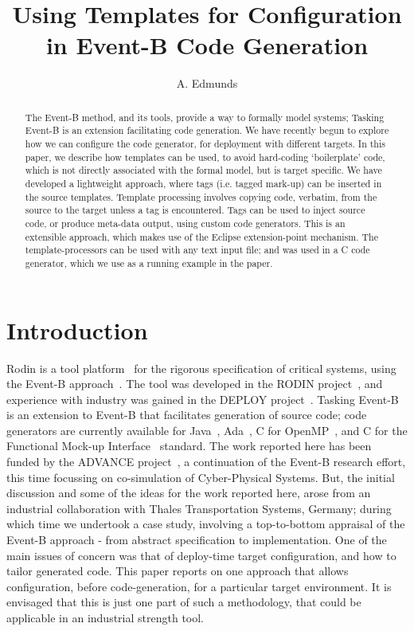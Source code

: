 \documentclass{llncs}%
\begin{document}
%
\title{Using Templates for Configuration\\ in Event-B Code Generation}

\author{A. Edmunds}


\maketitle
%
\begin{abstract}
The Event-B method, and  its tools, provide a way to formally model systems; Tasking Event-B is an extension facilitating code generation.  We have recently begun to explore how we can configure the code generator, for deployment with different targets. In this paper, we describe how templates can be used, to avoid hard-coding `boilerplate' code, which is not directly associated with the formal model, but is target specific. We have developed a lightweight approach, where tags (i.e. tagged mark-up) can be inserted in the source templates. Template processing involves copying code, verbatim, from the source to the target unless a tag is encountered. Tags can be used to inject source code, or produce meta-data output, using custom code generators. This is an extensible approach, which makes use of the Eclipse extension-point mechanism. The template-processors can be used with any text input file; and was used in a C code generator, which we use as a running example in the paper. 
 \end{abstract}
%
%
\section{Introduction}
%
Rodin is a  tool platform~\cite{abrial10rodin} for the rigorous specification of critical systems, using the Event-B approach~\cite{ABR10}. The tool was developed in the RODIN project~\cite{RodinTool}, and experience with industry was gained in the DEPLOY project~\cite{DEPLOY}. Tasking Event-B~\cite{Edmunds2009,Edmunds2008,ae2011a,ae2012b} is an extension to Event-B that facilitates generation of source code; code generators are currently available for Java~\cite{JavaSpec}, Ada~\cite{ada2005}, C for OpenMP~\cite{openmp}, and C for the Functional Mock-up Interface~\cite{FMISTD} standard. The work reported here has been funded by the ADVANCE project~\cite{advance}, a continuation of the Event-B research effort, this time focussing on co-simulation of Cyber-Physical Systems. But, the initial discussion and some of the ideas for the work reported here, arose from an industrial collaboration with Thales Transportation Systems, Germany; during which time we undertook a case study, involving a top-to-bottom appraisal of the Event-B approach - from abstract specification to implementation. One of the main issues of concern was that of deploy-time target configuration, and how to tailor generated code. This paper reports on one approach that allows configuration, before code-generation, for a particular target environment. It is envisaged that this is just one part of such a methodology, that could be applicable in an industrial strength tool.   
\end{document}
